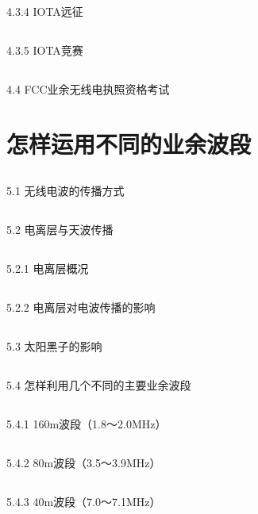 \documentclass[12pt,UTF8]{ctexbook}
\begin{document}
\section{}4.3.4 IOTA远征
\section{}4.3.5 IOTA竞赛
\section{}4.4 FCC业余无线电执照资格考试

\chapter{怎样运用不同的业余波段}

\section{}5.1 无线电波的传播方式
\section{}5.2 电离层与天波传播
\section{}5.2.1 电离层概况
\section{}5.2.2 电离层对电波传播的影响
\section{}5.3 太阳黑子的影响
\section{}5.4 怎样利用几个不同的主要业余波段
\section{}5.4.1 160m波段（1.8～2.0MHz）
\section{}5.4.2 80m波段（3.5～3.9MHz）
\section{}5.4.3 40m波段（7.0～7.1MHz）
\end{document}
